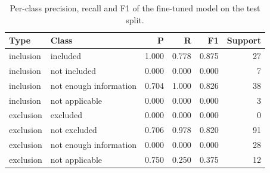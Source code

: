 \begin{table}[t]\centering\small
\caption{Per-class precision, recall and F1 of the fine-tuned model on the test split.}\label{tab:perclass}
\begin{tabular}{llrrrr}
\toprule
Type & Class & P & R & F1 & Support \\
\midrule
inclusion & included & 1.000 & 0.778 & 0.875 & 27 \\
inclusion & not included & 0.000 & 0.000 & 0.000 & 7 \\
inclusion & not enough information & 0.704 & 1.000 & 0.826 & 38 \\
inclusion & not applicable & 0.000 & 0.000 & 0.000 & 3 \\
exclusion & excluded & 0.000 & 0.000 & 0.000 & 0 \\
exclusion & not excluded & 0.706 & 0.978 & 0.820 & 91 \\
exclusion & not enough information & 0.000 & 0.000 & 0.000 & 28 \\
exclusion & not applicable & 0.750 & 0.250 & 0.375 & 12 \\
\bottomrule
\end{tabular}
\end{table}
